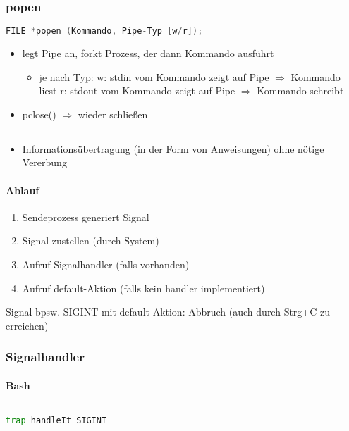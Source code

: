 \subsubsection{popen}
\begin{lstlisting}[language=C]
FILE *popen (Kommando, Pipe-Typ [w/r]);
\end{lstlisting}
\begin{itemize}
\item legt Pipe an, forkt Prozess, der dann Kommando ausführt
\begin{itemize}
\item je nach Typ:
w: stdin vom Kommando zeigt auf Pipe $\Rightarrow$ Kommando liest
r: stdout vom Kommando zeigt auf Pipe $\Rightarrow$ Kommando schreibt
\end{itemize}
\item pclose() $\Rightarrow$ wieder schließen
\end{itemize}

\subsection[Signale]{}
\begin{itemize}
\item Informationsübertragung (in der Form von Anweisungen) ohne nötige Vererbung
\end{itemize}
\paragraph{Ablauf}
\begin{enumerate}
\item Sendeprozess generiert Signal
\item Signal zustellen (durch System)
\item Aufruf Signalhandler (falls vorhanden)
\item Aufruf default-Aktion (falls kein handler implementiert)
\end{enumerate}
Signal bpsw. SIGINT mit default-Aktion: Abbruch (auch durch Strg+C zu erreichen)
\subsubsection{Signalhandler}
\paragraph{Bash} $ $
\begin{lstlisting}[language=bash]
trap handleIt SIGINT
\end{lstlisting}
